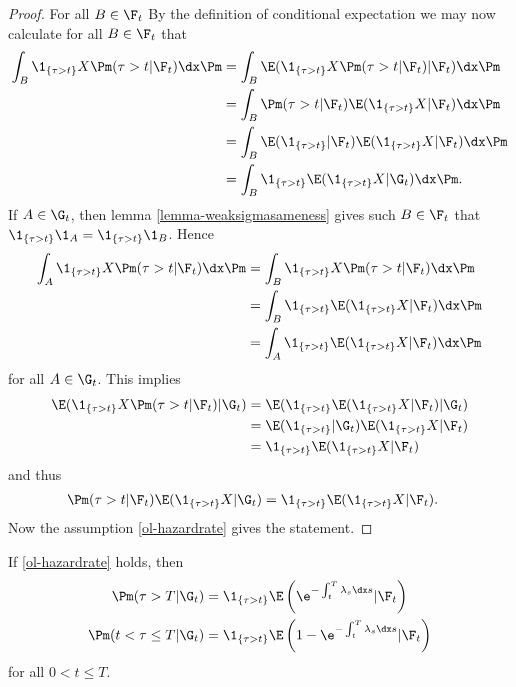 \begin{proof}
For all $B \in \F_t$ By the definition of conditional expectation we may now calculate for all $B \in \F_t$ that
  \begin{align}
    \int_B \1_{ \{ \tau > t \} } X \Pm ( \tau > t | \F_t ) \dx \Pm &= \int_B \E ( \1_{ \{ \tau > t \} } X \Pm ( \tau > t | \F_t ) | \F_t ) \dx \Pm \\
    &= \int_B \Pm ( \tau > t | \F_t ) \E ( \1_{ \{ \tau > t \} } X | \F_t )  \dx \Pm \\
    &= \int_B \E ( \1_{ \{\tau > t\} } | \F_t ) \E ( \1_{ \{ \tau > t \} } X | \F_t )  \dx \Pm \\
    &= \int_B \1_{ \{ \tau > t \} } \E ( \1_{ \{ \tau > t \} } X | \G_t ) \dx \Pm .
  \end{align}
If $A \in \G_t$, then lemma \ref{lemma-weaksigmasameness} gives such $B \in \F_t$ that $\1_{ \{ \tau > t \} } \1_A = \1_{ \{ \tau > t \} } \1_B$. Hence
  \begin{align}
    \int_A \1_{ \{ \tau > t \} } X \Pm ( \tau > t | \F_t ) \dx \Pm &= \int_B \1_{ \{ \tau > t \} } X \Pm ( \tau > t | \F_t ) \dx \Pm \\   
    &= \int_B \1_{ \{ \tau > t \} } \E ( \1_{ \{ \tau > t \} } X | \F_t ) \dx \Pm \\
    &= \int_A \1_{ \{ \tau > t \} } \E ( \1_{ \{ \tau > t \} } X | \F_t ) \dx \Pm
  \end{align}
for all $A \in \G_t$. This implies
\begin{align}
    \E ( \1_{ \{ \tau > t \} } X \Pm ( \tau > t | \F_t ) | \G_t ) &= \E ( \1_{ \{ \tau > t \} } \E ( \1_{ \{ \tau > t \} } X | \F_t ) | \G_t ) \\
    &= \E ( \1_{ \{ \tau > t \} } | \G_t ) \E ( \1_{ \{ \tau > t \} } X | \F_t ) \\
    &= \1_{ \{ \tau > t \} } \E ( \1_{ \{ \tau > t \} } X | \F_t )
  \end{align}
and thus
\begin{align}
    \Pm ( \tau > t | \F_t ) \E ( \1_{ \{ \tau > t \} } X | \G_t ) &= \1_{ \{ \tau > t \} } \E ( \1_{ \{ \tau > t \} } X | \F_t ).
  \end{align}
Now the assumption \ref{ol-hazardrate} gives the statement.
\end{proof}

\begin{lemma}
If \ref{ol-hazardrate} holds, then
  \begin{align}
    \Pm ( \tau > T | \G_t ) &= \1_{ \{ \tau > t \} } \E \left( \e^{-\int_t^T \lambda_s \dx s} | \F_t \right) \\
    \Pm ( t < \tau \leq T | \G_t ) &= \1_{ \{ \tau > t \} } \E \left( 1 - \e^{-\int_t^T \lambda_s \dx s} | \F_t \right)
  \end{align}
for all $0 < t \leq T$.
\end{lemma}

